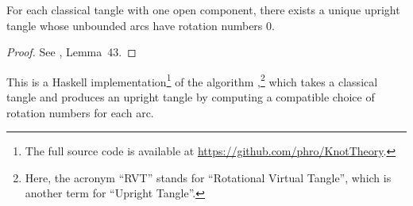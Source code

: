 \begin{lemma}
        For each classical tangle with one open component, there exists a unique
        upright tangle whose unbounded arcs have rotation numbers $0$.
\end{lemma}
\begin{proof}
        See \cite{BV}, Lemma~43.
\end{proof}

This is a Haskell implementation\footnote{The full source code is available at
\url{https://github.com/phro/KnotTheory}.} of the algorithm ,\footnote{Here, the
acronym \enquote{RVT} stands for \enquote{Rotational Virtual Tangle}, which is
another term for \enquote{Upright Tangle}.} which takes a classical tangle and
produces an upright tangle by computing a compatible choice of rotation numbers
for each arc.


